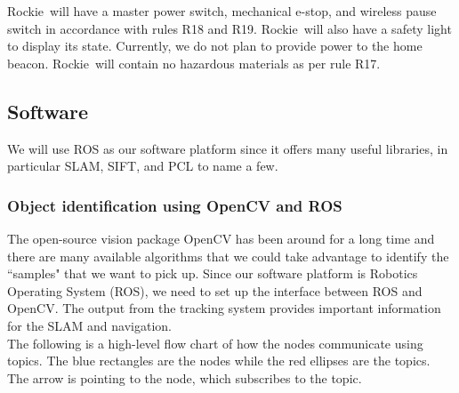 \documentclass{paper}
\newcommand \robotName{Rockie} 		%
\begin{document}
	\robotName \ will have a master power switch, mechanical e-stop, and wireless pause switch in accordance with rules R18 and R19.  \robotName \ will also have a safety light to display its state.  Currently, we do not plan to provide power to the home beacon.  
	\robotName \ will contain no hazardous materials as per rule R17.  



\subsection*{Software}

	We will use ROS as our software platform since it offers many useful libraries, in particular SLAM, SIFT, and PCL to name a few.     

\subsubsection*{Object identification using OpenCV and ROS}
The open-source vision package OpenCV has been around for a long time and there are many available algorithms that we could take advantage to identify the ``samples" that we want to pick up. Since  our software platform is Robotics Operating System (ROS), we need to set up the interface between ROS and OpenCV. The output from the tracking system provides important information for the SLAM and navigation. \\ 

The following is a high-level flow chart of how the nodes communicate using topics. The blue rectangles are the nodes while the red ellipses are the topics. The arrow is pointing to the node, which subscribes to the topic. 
\end{document}
